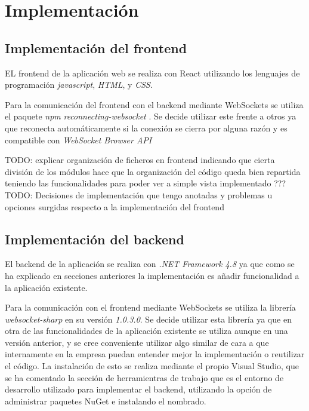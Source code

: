 \chapter{Implementación}


\section{Implementación del frontend}

EL frontend de la aplicación web se realiza con React utilizando los lenguajes de programación \textit{javascript}, \textit{HTML}, y \textit{CSS}.

Para la comunicación del frontend con el backend mediante WebSockets se utiliza el paquete \textit{npm} \textit{reconnecting-websocket} \cite{reconect-ws}. Se decide utilizar este frente a otros ya que reconecta automáticamente si la conexión se cierra por alguna razón y es compatible con \textit{WebSocket Browser API} \cite{api-ws-front}\newline

TODO: explicar organización de ficheros en frontend indicando que cierta división de los módulos hace que la organización del código queda bien repartida teniendo las funcionalidades para poder ver a simple vista implementado ??? \\

TODO: Decisiones de implementación que tengo anotadas y problemas u opciones surgidas respecto a la implementación del frontend \\

\section{Implementación del backend}

El backend de la aplicación se realiza con \textit{.NET Framework 4.8} ya que como se ha explicado en secciones anteriores la implementación es añadir funcionalidad a la aplicación existente. \newline

Para la comunicación con el frontend mediante WebSockets se utiliza la librería \textit{websocket-sharp} \cite{websocket-sharp} en su versión \textit{1.0.3.0}.
Se decide utilizar esta librería ya que en otra de las funcionalidades de la aplicación existente se utiliza aunque en una versión anterior, y se cree conveniente utilizar algo similar de cara a que internamente en la empresa puedan entender mejor la implementación o reutilizar el código.
La instalación de esto se realiza mediante el propio Visual Studio, que se ha comentado la sección de herramientras de trabajo que es el entorno de desarrollo utilizado para implementar el backend, utilizando la opción de administrar paquetes NuGet e instalando el nombrado. \newline 

